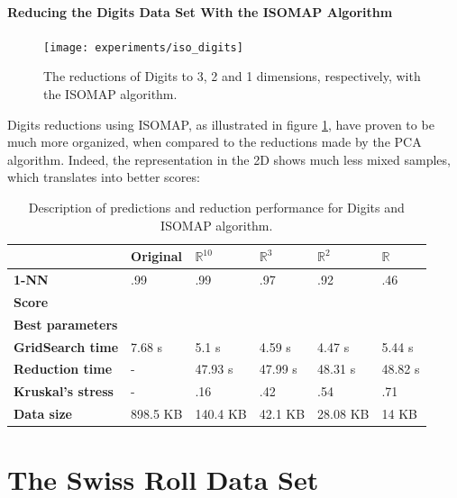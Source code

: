\paragraph{Reducing the Digits Data Set With the ISOMAP Algorithm}

\begin{figure}[H]
	\centering
	\captionsetup{justification=centering}
	\texttt{[image: experiments/iso\_digits]}
	\caption{The reductions of Digits to 3, 2 and 1 dimensions, respectively, with the ISOMAP algorithm.}
	\label{fig:dsdigitsiso}
\end{figure}

Digits reductions using ISOMAP, as illustrated in figure \ref{fig:dsdigitsiso}, have proven to be much more organized, when compared to the reductions made by the PCA algorithm. Indeed, the representation in the 2D shows much less mixed samples, which translates into better scores:

\begin{table}[H]
	\centering
	
	\begin{tabular}{|p{.14\linewidth}|p{.14\linewidth}|p{.14\linewidth}|p{.14\linewidth}|p{.14\linewidth}|p{.14\linewidth}|}
		\hline
		& \textbf{Original} & $\mathbb{R}^{10}$ & $\mathbb{R}^3$ & $\mathbb{R}^2$ & $\mathbb{R}$ \\\hline
		\textbf{1-NN} & .99 & .99 & .97 & .92 & .46 \\\hline
		\textbf{Score} & & & & & \\\hline
		\textbf{Best parameters} & & & & & \\\hline
		\textbf{GridSearch time} & 7.68 s & 5.1 s & 4.59 s & 4.47 s & 5.44 s \\\hline
		\textbf{Reduction time} & - & 47.93 s & 47.99 s & 48.31 s & 48.82 s \\\hline
		\textbf{Kruskal's stress} & - & .16 & .42 & .54 & .71 \\\hline
		\textbf{Data size} & 898.5 KB & 140.4 KB & 42.1 KB & 28.08 KB & 14 KB \\\hline
	\end{tabular}
	
	\caption{Description of predictions and reduction performance for Digits and ISOMAP algorithm.}
\end{table}

\clearpage
\section{The Swiss Roll Data Set}

